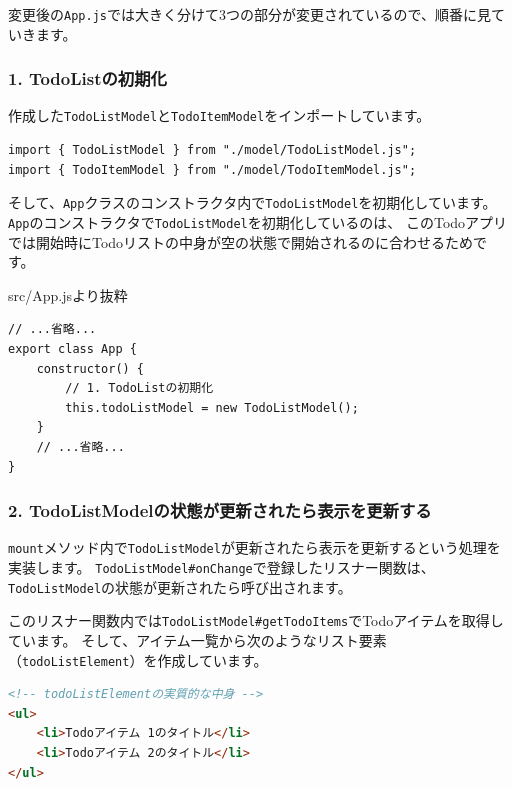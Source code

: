 変更後の\texttt{App.js}では大きく分けて3つの部分が変更されているので、順番に見ていきます。

\hypertarget{app-todolist-initialize}{%
\subsubsection{1. TodoListの初期化}\label{app-todolist-initialize}}

作成した\texttt{TodoListModel}と\texttt{TodoItemModel}をインポートしています。

\begin{lstlisting}
import { TodoListModel } from "./model/TodoListModel.js";
import { TodoItemModel } from "./model/TodoItemModel.js";
\end{lstlisting}

そして、\texttt{App}クラスのコンストラクタ内で\texttt{TodoListModel}を初期化しています。
\texttt{App}のコンストラクタで\texttt{TodoListModel}を初期化しているのは、
このTodoアプリでは開始時にTodoリストの中身が空の状態で開始されるのに合わせるためです。

\begin{listtitle}
src/App.jsより抜粋
\end{listtitle}
\begin{lstlisting}
// ...省略...
export class App {
    constructor() {
        // 1. TodoListの初期化
        this.todoListModel = new TodoListModel();
    }
    // ...省略...
}
\end{lstlisting}
\listend

\hypertarget{app-todolist-onchange}{%
\subsubsection{2. TodoListModelの状態が更新されたら表示を更新する}\label{app-todolist-onchange}}

\texttt{mount}メソッド内で\texttt{TodoListModel}が更新されたら表示を更新するという処理を実装します。
\texttt{TodoListModel\#onChange}で登録したリスナー関数は、\texttt{TodoListModel}の状態が更新されたら呼び出されます。

このリスナー関数内では\texttt{TodoListModel\#getTodoItems}でTodoアイテムを取得しています。
そして、アイテム一覧から次のようなリスト要素（\texttt{todoListElement}）を作成しています。

\begin{lstlisting}[language=HTML]
<!-- todoListElementの実質的な中身 -->
<ul>
    <li>Todoアイテム 1のタイトル</li>
    <li>Todoアイテム 2のタイトル</li>
</ul>
\end{lstlisting}

